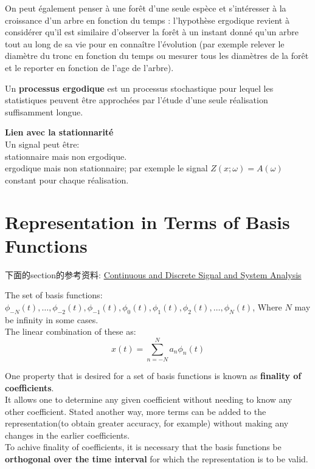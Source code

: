 \documentclass{article}
\begin{document}
On peut \'egalement penser \`a une for\^et d'une seule esp\`ece et s'int\'eresser \`a la croissance d'un arbre en fonction du temps : l'hypoth\`ese ergodique revient \`a consid\'erer qu'il est similaire d'observer la for\^et \`a un instant donn\'e qu'un arbre tout au long de sa vie pour en conna\^itre l'\'evolution (par exemple relever le diam\`etre du tronc en fonction du temps ou mesurer tous les diam\`etres de la for\^et et le reporter en fonction de l'age de l'arbre).

\bigskip
Un \textbf{processus ergodique} est un processus stochastique pour lequel les statistiques peuvent \^etre approch\'ees par l'\'etude d'une seule r\'ealisation suffisamment longue.

\bigskip
\textbf{Lien avec la stationnarit\'e}\\
Un signal peut \^etre:\\
stationnaire mais non ergodique.\\
ergodique mais non stationnaire; par exemple le signal $Z(x; \omega)=A(\omega)$ constant pour chaque r\'ealisation.

\section{Representation in Terms of Basis Functions}
下面的section的参考资料:
\href{http://www.amazon.com/Continuous-Discrete-Signal-System-Analysis/dp/0030510198}{Continuous and Discrete Signal and System Analysis}

The set of basis functions: $ \phi_{-N}(t), \ldots, \phi_{-2}(t), \phi_{-1}(t), \phi_0(t), \phi_1(t), \phi_2(t), \ldots, \phi_N(t)$, Where $N$ may be infinity in some cases.\\
The linear combination of these as:
\begin{equation}
x(t) = \sum_{n = -N}^N a_n \phi_n(t)
\label{eq.base.combination}
\end{equation}

One property that is desired for a set of basis functions is known as \textbf{finality of coefficients}.\\
It allows one to determine any given coefficient without needing to know any other coefficient. 
Stated another way, more terms can be added to the representation(to obtain greater accuracy, for example) without making any changes in the earlier coefficients.\\
To achive finality of coefficients, it is necessary that the basis functions be \textbf{orthogonal over the time interval} 
for which the representation is to be valid.
\end{document}
